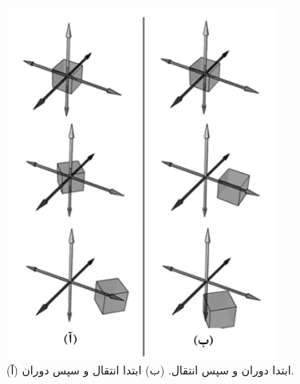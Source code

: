 {\begin{spacing}{1.5}
        \begin{figure}[H]
            \centering
            \setlength{\belowcaptionskip}{-10pt}
            \includegraphics[width=0.8\textwidth]{Images/4/3/4.Session.1.3.9}
            \caption {(آ) ابتدا دوران و سپس انتقال. (ب) ابتدا انتقال و سپس دوران.}
            \label{fig:4.Session.1.3.9}
        \end{figure}
    \end{spacing}
}


